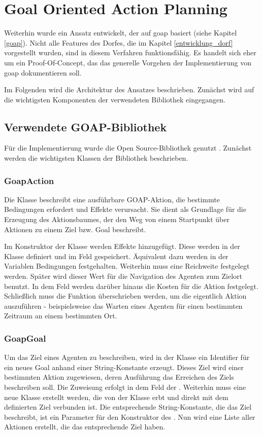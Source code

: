 \section{Goal Oriented Action Planning}
Weiterhin wurde ein Ansatz entwickelt, der auf \ac{goap} basiert (siehe Kapitel \ref{goap}). Nicht alle Features des Dorfes, die im Kapitel \ref{entwicklung_dorf} vorgestellt wurden, sind in diesem Verfahren funktionsfähig. Es handelt sich eher um ein Proof-Of-Concept, das das generelle Vorgehen der Implementierung von \ac{goap} dokumentieren soll.

Im Folgenden wird die Architektur des Ansatzes beschrieben. Zunächst wird auf die wichtigsten Komponenten der verwendeten Bibliothek eingegangen.


\subsection{Verwendete GOAP-Bibliothek}
Für die Implementierung wurde die Open Source-Bibliothek  genutzt \cite{goap_library}. Zunächst werden die wichtigsten Klassen der Bibliothek beschrieben.

\subsubsection{GoapAction}
Die Klasse  beschreibt eine ausführbare GOAP-Aktion, die bestimmte Bedingungen erfordert und Effekte verursacht. Sie dient als Grundlage für die Erzeugung des Aktionsbaumes, der den Weg von einem Startpunkt über Aktionen zu einem Ziel bzw. Goal beschreibt.

Im Konstruktor der Klasse werden Effekte hinzugefügt. Diese werden in der Klasse  definiert und im Feld  gespeichert. Äquivalent dazu werden in der Variablen  Bedingungen festgehalten. Weiterhin muss eine Reichweite  festgelegt werden. Später wird dieser Wert für die Navigation des Agenten zum Zielort benutzt. In dem Feld  werden darüber hinaus die Kosten für die Aktion festgelegt.
Schließlich muss die Funktion  überschrieben werden, um die eigentlich Aktion auszuführen - beispielsweise das Warten eines Agenten für einen bestimmten Zeitraum an einem bestimmten Ort.

\subsubsection{GoapGoal}
Um das Ziel eines Agenten zu beschreiben, wird in der Klasse  ein Identifier für ein neues Goal anhand einer String-Konstante erzeugt. Dieses Ziel wird einer bestimmten Aktion zugewiesen, deren Ausführung das Erreichen des Ziels beschreiben soll. Die Zuweisung erfolgt in dem Feld  der .
Weiterhin muss eine neue Klasse erstellt werden, die von der Klasse  erbt und direkt mit dem definierten Ziel verbunden ist. Die entsprechende String-Konstante, die das Ziel beschreibt, ist ein Parameter für den Konstruktor des . Nun wird eine Liste aller Aktionen erstellt, die das entsprechende Ziel haben.

